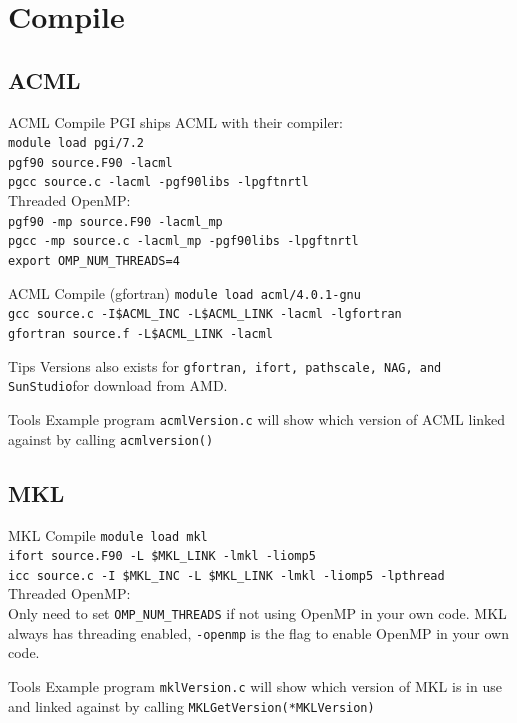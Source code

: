 \documentclass[handout]{beamer}
\begin{document}
\section{Compile}
\subsection{ACML}
\begin{frame}{ACML Compile}
PGI ships ACML with their compiler: \\
\texttt{module load pgi/7.2}        \\
\texttt{pgf90 source.F90 -lacml}    \\
\texttt{pgcc  source.c -lacml -pgf90libs -lpgftnrtl} \\
Threaded OpenMP:                    \\
\texttt{pgf90 -mp source.F90 -lacml\_mp}            \\
\texttt{pgcc  -mp source.c   -lacml\_mp -pgf90libs -lpgftnrtl} \\
\texttt{export OMP\_NUM\_THREADS=4}                 \\
\end{frame}
\begin{frame}{ACML Compile (gfortran)}
\texttt{module load acml/4.0.1-gnu}       \\
\texttt{gcc source.c -I\$ACML\_INC -L\$ACML\_LINK -lacml -lgfortran} \\
\texttt{gfortran source.f -L\$ACML\_LINK -lacml}  \\
\begin{block}{Tips}
Versions also exists for \texttt{gfortran, ifort, pathscale, NAG, and SunStudio}for download from AMD. 
\end{block}
\begin{block}{Tools}
Example program \texttt{acmlVersion.c} will show which version of ACML linked against by calling \texttt{acmlversion()}
\end{block}
\end{frame}

\subsection{MKL}
\begin{frame}{MKL Compile}
\texttt{module load mkl}            \\
\texttt{ifort source.F90 -L \$MKL\_LINK -lmkl -liomp5}      \\
\texttt{icc   source.c   -I \$MKL\_INC -L \$MKL\_LINK -lmkl -liomp5 -lpthread}  \\
Threaded OpenMP:                    \\
Only need to set \texttt{OMP\_NUM\_THREADS} if not using OpenMP in your own code.  MKL always has threading enabled, \texttt{-openmp} is the flag to enable OpenMP in your own code.
\begin{block}{Tools}
Example program \texttt{mklVersion.c} will show which version of MKL is in use and linked against by calling \texttt{MKLGetVersion(*MKLVersion)} \\
\end{block}
\end{frame}
\end{document}
